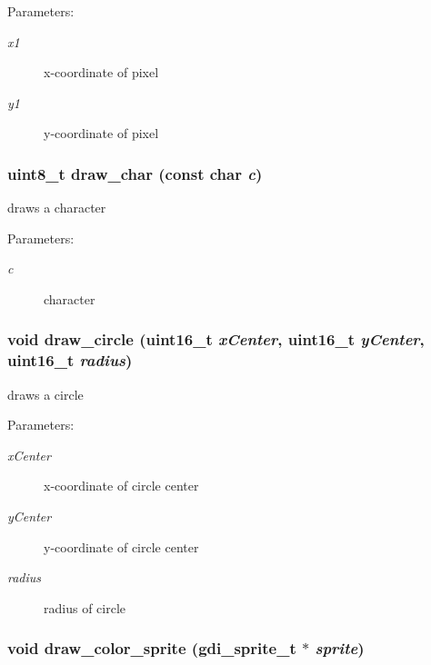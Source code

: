 \begin{Desc}
\item[Parameters:]
\begin{description}
\item[{\em x1}]x-coordinate of pixel \item[{\em y1}]y-coordinate of pixel \end{description}
\end{Desc}
\hypertarget{group__hgdi__api_g1701f17a87fc25691c886ac822622491}{
\subsubsection[{draw\_\-char}]{\setlength{\rightskip}{0pt plus 5cm}uint8\_\-t draw\_\-char (const char {\em c})}}
\label{group__hgdi__api_g1701f17a87fc25691c886ac822622491}


draws a character 

\begin{Desc}
\item[Parameters:]
\begin{description}
\item[{\em c}]character \end{description}
\end{Desc}
\hypertarget{group__hgdi__api_gd2f97e49f85d6c4126e325042fcf0135}{
\subsubsection[{draw\_\-circle}]{\setlength{\rightskip}{0pt plus 5cm}void draw\_\-circle (uint16\_\-t {\em xCenter}, \/  uint16\_\-t {\em yCenter}, \/  uint16\_\-t {\em radius})}}
\label{group__hgdi__api_gd2f97e49f85d6c4126e325042fcf0135}


draws a circle 

\begin{Desc}
\item[Parameters:]
\begin{description}
\item[{\em xCenter}]x-coordinate of circle center \item[{\em yCenter}]y-coordinate of circle center \item[{\em radius}]radius of circle \end{description}
\end{Desc}
\hypertarget{group__hgdi__api_g39f639f5516f6a0fea13f7ffb39d2dcb}{
\subsubsection[{draw\_\-color\_\-sprite}]{\setlength{\rightskip}{0pt plus 5cm}void draw\_\-color\_\-sprite ({\bf gdi\_\-sprite\_\-t} $\ast$ {\em sprite})}}
\label{group__hgdi__api_g39f639f5516f6a0fea13f7ffb39d2dcb}


